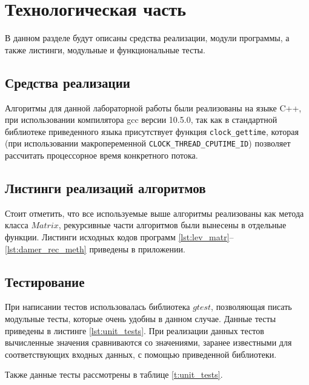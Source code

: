 \chapter{Технологическая часть}
В данном разделе будут описаны средства реализации, модули программы, а также листинги, модульные и функциональные тесты.

\section{Средства реализации}
Алгоритмы для данной лабораторной работы были реализованы на языке C++, при использовании компилятора gcc версии 10.5.0, так как в стандартной библиотеке приведенного языка
присутствует функция \texttt{clock\_gettime}, которая (при использовании макропеременной \texttt{CLOCK\_THREAD\_CPUTIME\_ID}) позволяет рассчитать процессорное время конкретного потока.\cite{cpp-time}



\section{Листинги реализаций алгоритмов}

Стоит отметить, что все используемые выше алгоритмы реализованы как метода класса $Matrix$, рекурсивные части алгоритмов были вынесены в отдельные функции.
Листинги исходных кодов программ  \ref{lst:lev_matr}--\ref{lst:damer_rec_meth} приведены в приложении.


\section{Тестирование}
При написании тестов использовалась библиотека $gtest$, позволяющая писать модульные тесты, которые очень удобны 
в данном случае. Данные тесты приведены в листинге  \ref{lst:unit_tests}. При реализации данных тестов вычисленные значения
сравниваются со значениями, заранее известными для соответствующих входных данных, с помощью приведенной библиотеки.


Также данные тесты рассмотрены в таблице \ref{t:unit_tests}.

